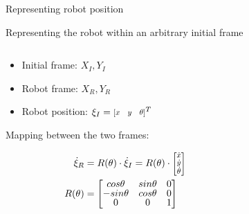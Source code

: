 \documentclass[compress]{beamer}
\newcommand{\colvec}[2][.8]{%
  \scalebox{#1}{%
    \renewcommand{\arraystretch}{.8}%
    $\begin{bmatrix}#2\end{bmatrix}$%
  }
}
\begin{document}
\begin{frame}{Representing robot position}

    Representing the robot within an arbitrary initial frame

    \begin{columns}
        \begin{column}{0.6\linewidth}
            \begin{itemize}
                \item Initial frame: ${X_I, Y_I}$
                \item Robot frame: ${X_R, Y_R}$
                \item Robot position: $\xi_I = \colvec{x & y & \theta}^T$
            \end{itemize}

            \vspace{1em}

            Mapping between the two frames:

            \begin{align*}
                \dot\xi_R &= R(\theta)\cdot \dot\xi_I = R(\theta)\cdot \colvec{\dot{x} \\ \dot{y} \\ \dot\theta} \\ 
                R(\theta) &= \begin{bmatrix} cos\theta & sin\theta & 0 \\
                    -sin\theta & cos\theta & 0 \\
                0 &         0 & 1 \end{bmatrix}
            \end{align*}


        \end{column}
        \begin{column}{0.4\linewidth}

\end{column}
\end{columns}
\end{frame}
\end{document}
